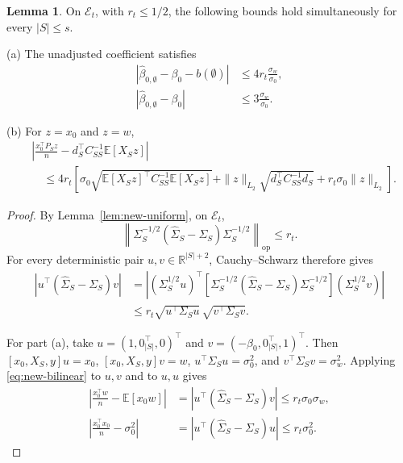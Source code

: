 \documentclass[a4paper,10pt,english]{article}
\theoremstyle{definition}
\newtheorem{lemma}{Lemma}
\begin{document}
\begin{review}
\begin{lemma}\label{lem:new-projected}
On \(\mathcal E_t\), with \(r_t\le1/2\), the following bounds hold
simultaneously for every \(|S|\le s\).

\textup{(a)} The unadjusted coefficient satisfies
\begin{equation}\label{eq:new-baseline-bounds}
 \begin{aligned}
 |\hat\beta_{0,\emptyset}-\beta_0-b(\emptyset)|
 &\le4r_t\frac{\sigma_w}{\sigma_0},\\
 |\hat\beta_{0,\emptyset}-\beta_0|
 &\le3\frac{\sigma_w}{\sigma_0}.
 \end{aligned}
\end{equation}

\textup{(b)} For \(z=x_0\) and \(z=w\),
\begin{equation}\label{eq:new-projected-bound}
 \begin{aligned}
 &\left|
 \frac{x_0^\top P_Sz}{n}
 -d_S^\top C_{SS}^{-1}\mathbb E[X_Sz]
 \right|\\
 &\quad\le
 4r_t\left[
 \sigma_0
 \sqrt{\mathbb E[X_Sz]^\top C_{SS}^{-1}\mathbb E[X_Sz]}
 +\|z\|_{L_2}\sqrt{d_S^\top C_{SS}^{-1}d_S}
 +r_t\sigma_0\|z\|_{L_2}
 \right].
 \end{aligned}
\end{equation}
\end{lemma}

\begin{proof}
By Lemma~\ref{lem:new-uniform}, on \(\mathcal E_t\),
\begin{equation}\label{eq:new-augmented-operator}
 \left\|
 \Sigma_S^{-1/2}
 (\widehat\Sigma_S-\Sigma_S)
 \Sigma_S^{-1/2}
 \right\|_{\mathrm{op}}
 \le r_t.
\end{equation}
\rbreak
For every deterministic pair \(u,v\in\mathbb R^{|S|+2}\),
Cauchy--Schwarz therefore gives
\begin{equation}\label{eq:new-bilinear}
 \begin{aligned}
 \left|u^\top(\widehat\Sigma_S-\Sigma_S)v\right|
 &=
 \left|
 (\Sigma_S^{1/2}u)^\top
 \left[
 \Sigma_S^{-1/2}(\widehat\Sigma_S-\Sigma_S)\Sigma_S^{-1/2}
 \right]
 (\Sigma_S^{1/2}v)
 \right|\\
 &\le
 r_t\sqrt{u^\top\Sigma_Su}\,
 \sqrt{v^\top\Sigma_Sv}.
 \end{aligned}
\end{equation}

For part (a), take \(u=(1,0_{|S|}^\top,0)^\top\) and
\(v=(-\beta_0,0_{|S|}^\top,1)^\top\).
\rbreak
Then \([x_0,X_S,y]u=x_0\), \([x_0,X_S,y]v=w\),
\(u^\top\Sigma_Su=\sigma_0^2\), and
\(v^\top\Sigma_Sv=\sigma_w^2\).
\rbreak
Applying \eqref{eq:new-bilinear} to \(u,v\) and to \(u,u\) gives
\begin{equation}\label{eq:new-scalar-moments}
 \begin{aligned}
 \left|\frac{x_0^\top w}{n}-\mathbb E[x_0w]\right|
 &=
 \left|u^\top(\widehat\Sigma_S-\Sigma_S)v\right|
 \le r_t\sigma_0\sigma_w,\\
 \left|\frac{x_0^\top x_0}{n}-\sigma_0^2\right|
 &=
 \left|u^\top(\widehat\Sigma_S-\Sigma_S)u\right|
 \le r_t\sigma_0^2.
 \end{aligned}
\end{equation}


\end{proof}
\end{review}
\end{document}
